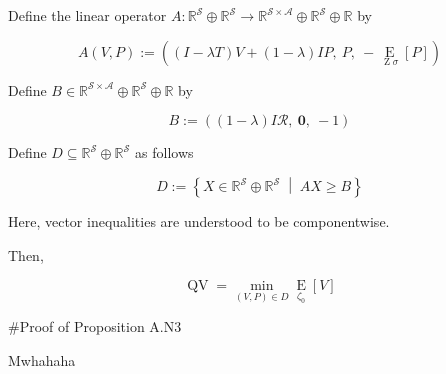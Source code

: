 \documentclass[a4paper]{article}
\newcommand{\AP}[1]{\left(#1\right)}
\newcommand{\AB}[1]{\left[#1\right]}
\newcommand{\ACM}[2]{\left\{#1\;\middle\vert\;#2\right\}}
\newcommand{\Ea}[2]{\underset{#1}{\operatorname{E}}\AB{#2}}
\newcommand{\Reals}{\mathbb{R}}
\newcommand{\A}{\mathcal{A}}
\newcommand{\St}{\mathcal{S}}
\newcommand{\R}{\mathcal{R}}
\newcommand{\QV}{\operatorname{QV}}
\DeclareMathOperator{\Z}{Z}
\begin{document}
Define the linear operator $A: \Reals^\St \oplus \Reals^\St \rightarrow \Reals^{\St\times\A}\oplus\Reals^{\St}\oplus\Reals$ by

$$A(V,P):=\AP{\AP{I-\lambda T}V + (1-\lambda)IP,\ P,\ -\Ea{\Z\sigma}{P}}$$

Define $B\in \Reals^{\St\times\A}\oplus\Reals^{\St}\oplus\Reals$ by

$$B:=\AP{(1-\lambda)I\R,\ \boldsymbol{0},\ -1}$$

Define $D \subseteq \Reals^\St \oplus \Reals^\St$ as follows

$$D:=\ACM{X \in \Reals^\St \oplus \Reals^\St}{AX \geq B}$$

Here, vector inequalities are understood to be componentwise.

Then,

$$\QV = \min_{(V,P)\in D}{\Ea{\zeta_0}{V}}$$

\#Proof of Proposition A.N3

Mwhahaha
\end{document}

